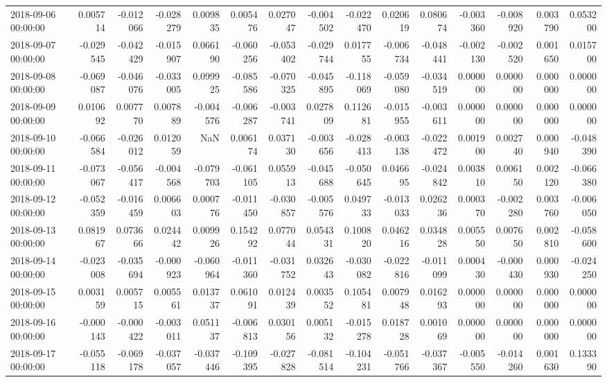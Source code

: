 \begin{tabular}{lrrrrrrrrrrrrrr}
2018-09-06 00:00:00 & 0.005714 & -0.012066 & -0.028279 & 0.009835 & 0.005476 & 0.027047 & -0.004502 & -0.022470 & 0.020619 & 0.080674 & -0.003360 & -0.008920 & 0.003790 & 0.053200 \\
2018-09-07 00:00:00 & -0.029545 & -0.042429 & -0.015907 & 0.066190 & -0.060256 & -0.053402 & -0.029744 & 0.017755 & -0.006734 & -0.048441 & -0.002130 & -0.002520 & 0.001650 & 0.015700 \\
2018-09-08 00:00:00 & -0.069087 & -0.046076 & -0.033005 & 0.099925 & -0.085586 & -0.070325 & -0.045895 & -0.118069 & -0.059080 & -0.034519 & 0.000000 & 0.000000 & 0.000000 & 0.000000 \\
2018-09-09 00:00:00 & 0.010692 & 0.007770 & 0.007889 & -0.004576 & -0.006287 & -0.003741 & 0.027809 & 0.112681 & -0.015955 & -0.003611 & 0.000000 & 0.000000 & 0.000000 & 0.000000 \\
2018-09-10 00:00:00 & -0.066584 & -0.026012 & 0.012059 & NaN & 0.006174 & 0.037130 & -0.003656 & -0.028413 & -0.003138 & -0.022472 & 0.001900 & 0.002740 & 0.000940 & -0.048390 \\
2018-09-11 00:00:00 & -0.073067 & -0.056417 & -0.004568 & -0.079703 & -0.061105 & 0.055913 & -0.045688 & -0.050645 & 0.046695 & -0.024842 & 0.003810 & 0.006150 & 0.002120 & -0.066380 \\
2018-09-12 00:00:00 & -0.052359 & -0.016459 & 0.006603 & 0.000776 & -0.011450 & -0.030857 & -0.005576 & 0.049733 & -0.013033 & 0.026236 & 0.000370 & -0.002280 & 0.003760 & -0.006050 \\
2018-09-13 00:00:00 & 0.081967 & 0.073666 & 0.024442 & 0.009926 & 0.154292 & 0.077044 & 0.054331 & 0.100820 & 0.046216 & 0.034828 & 0.005550 & 0.007650 & 0.002810 & -0.058600 \\
2018-09-14 00:00:00 & -0.023008 & -0.035694 & -0.000923 & -0.060964 & -0.011360 & -0.031752 & 0.032643 & -0.030082 & -0.022816 & -0.011099 & 0.000430 & -0.000430 & 0.000930 & -0.024250 \\
2018-09-15 00:00:00 & 0.003159 & 0.005715 & 0.005561 & 0.013737 & 0.061091 & 0.012439 & 0.003552 & 0.105481 & 0.007948 & 0.016293 & 0.000000 & 0.000000 & 0.000000 & 0.000000 \\
2018-09-16 00:00:00 & -0.000143 & -0.000422 & -0.003011 & 0.051137 & -0.006813 & 0.030156 & 0.005132 & -0.015278 & 0.018728 & 0.001069 & 0.000000 & 0.000000 & 0.000000 & 0.000000 \\
2018-09-17 00:00:00 & -0.055118 & -0.069178 & -0.037057 & -0.037446 & -0.109395 & -0.027828 & -0.081514 & -0.104231 & -0.051766 & -0.037367 & -0.005550 & -0.014260 & 0.001630 & 0.133390 \\

\end{tabular}
